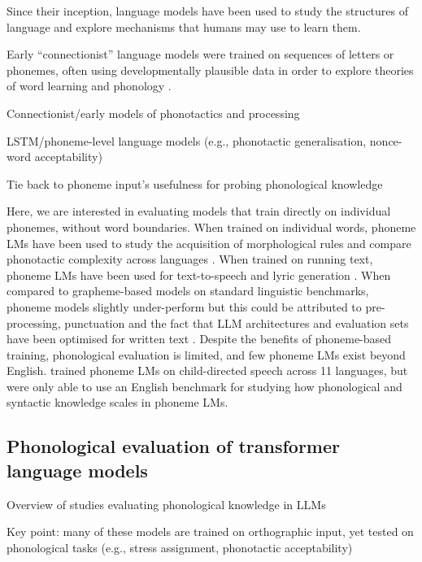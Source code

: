 Since their inception, language models have been used to study the structures of language and explore mechanisms that humans may use to learn them. 

Early ``connectionist'' language models were trained on sequences of letters or phonemes, often using developmentally plausible data in order to explore theories of word learning and phonology \citep{seidenberg1989distributed, norris1994shortlist, coltheart2001drc}. 


Connectionist/early models of phonotactics and processing

LSTM/phoneme-level language models (e.g., phonotactic generalisation, nonce-word acceptability)

Tie back to phoneme input’s usefulness for probing phonological knowledge


Here, we are interested in evaluating models that train directly on individual phonemes, without word boundaries. When trained on individual words, phoneme LMs have been used to study the acquisition of morphological rules \citep{kirov-2018-recurrent} and compare phonotactic complexity across languages \citep{pimentel2020phonotactic}. When trained on running text, phoneme LMs have been used for text-to-speech \citep{li-2023-phoneme-level-bert} and lyric generation \citep{ding-2024-songcomposer}. When compared to grapheme-based models on standard linguistic benchmarks, phoneme models slightly under-perform \citep{nguyen-2022-word-boundaries, bunzeck2024graphemes} but this could be attributed to pre-processing, punctuation and the fact that LLM architectures and evaluation sets have been optimised for written text \citep{goriely2024babble}. Despite the benefits of phoneme-based training, phonological evaluation is limited, and few phoneme LMs exist beyond English. \citet{goriely2025} trained phoneme LMs on child-directed speech across 11 languages, but were only able to use an English benchmark for studying how phonological and syntactic knowledge scales in phoneme LMs. 


\subsection{Phonological evaluation of transformer language models}

Overview of studies evaluating phonological knowledge in LLMs

Key point: many of these models are trained on orthographic input, yet tested on phonological tasks (e.g., stress assignment, phonotactic acceptability)

